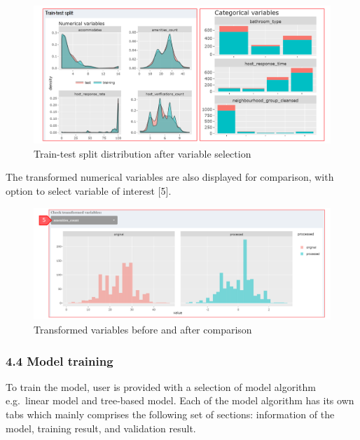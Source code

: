 \documentclass[
  12pt,
]{article}
\begin{document}
\begin{figure}[H]

{\centering \includegraphics[width=0.95\linewidth]{images/datatrf2} 

}

\caption{Train-test split distribution after variable selection}\label{fig:unnamed-chunk-15}
\end{figure}

The transformed numerical variables are also displayed for comparison,
with option to select variable of interest {[}5{]}.

\begin{figure}[H]

{\centering \includegraphics[width=0.95\linewidth]{images/datatrf3} 

}

\caption{Transformed variables before and after comparison}\label{fig:unnamed-chunk-16}
\end{figure}

\hypertarget{model-training}{%
\subsubsection{4.4 Model training}\label{model-training}}

To train the model, user is provided with a selection of model algorithm
e.g.~linear model and tree-based model. Each of the model algorithm has
its own tabs which mainly comprises the following set of sections:
information of the model, training result, and validation result.
\end{document}
